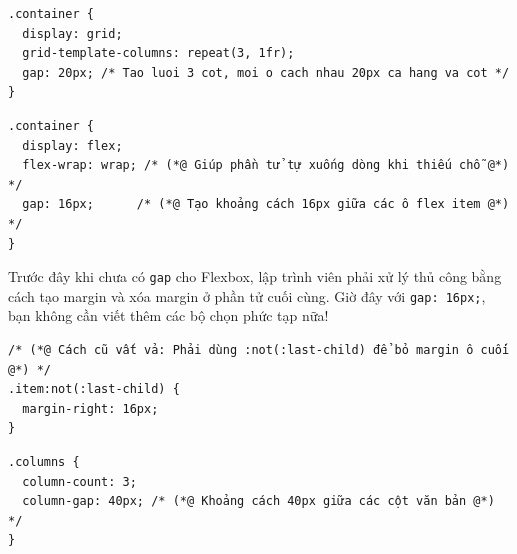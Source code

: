 \documentclass[11pt,oneside]{book}
\newcommand{\codeinline}[1]{\textcolor{accentOrange}{\texttt{#1}}}
\begin{document}
\begin{codeWindow}
\begin{lstlisting}[language=CSS3]
.container {
  display: grid;
  grid-template-columns: repeat(3, 1fr);
  gap: 20px; /* Tao luoi 3 cot, moi o cach nhau 20px ca hang va cot */
}
\end{lstlisting}
\end{codeWindow}

\begin{codeWindow}
\begin{lstlisting}[language=CSS3]
.container {
  display: flex;
  flex-wrap: wrap; /* (*@ Giúp phần tử tự xuống dòng khi thiếu chỗ @*) */
  gap: 16px;      /* (*@ Tạo khoảng cách 16px giữa các ô flex item @*) */
}
\end{lstlisting}
\end{codeWindow}

\begin{tipBox}
Trước đây khi chưa có \codeinline{gap} cho Flexbox, lập trình viên phải xử lý thủ công bằng cách tạo margin và xóa margin ở phần tử cuối cùng. Giờ đây với \codeinline{gap: 16px;}, bạn không cần viết thêm các bộ chọn phức tạp nữa!
\end{tipBox}

\begin{codeWindow}
\begin{lstlisting}[language=CSS3]
/* (*@ Cách cũ vất vả: Phải dùng :not(:last-child) để bỏ margin ô cuối @*) */
.item:not(:last-child) {
  margin-right: 16px;
}
\end{lstlisting}
\end{codeWindow}

\begin{codeWindow}
\begin{lstlisting}[language=CSS3]
.columns {
  column-count: 3;
  column-gap: 40px; /* (*@ Khoảng cách 40px giữa các cột văn bản @*) */
}
\end{lstlisting}
\end{codeWindow}
\end{document}
